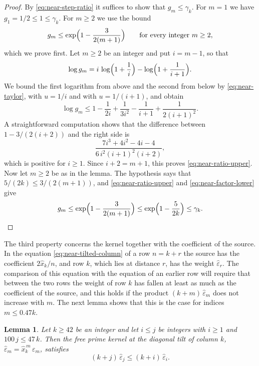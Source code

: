 \documentclass{amsart}
\newtheorem{lemma}[theorem]{Lemma}
\theoremstyle{definition}
\theoremstyle{remark}
\numberwithin{equation}{section}
\begin{document}
\begin{proof}
By \eqref{eq:near-step-ratio} it suffices to show that $g_m\le\gamma_k$.
For $m=1$ we have $g_1=1/2\le1\le\gamma_k$. For
$m\ge2$ we use the bound
\begin{equation}\label{eq:near-ratio-upper}
g_m\le\exp\Bigl(1-\frac{3}{2(m+1)}\Bigr)
\qquad\text{for every integer }m\ge2 ,
\end{equation}
which we prove first. Let $m\ge2$ be an integer and put $i=m-1$, so that
\[
\log g_m=i\,\log\Bigl(1+\frac1i\Bigr)-\log\Bigl(1+\frac{1}{i+1}\Bigr) .
\]
We bound the first logarithm from above and the second from below by
\eqref{eq:near-taylor}, with $u=1/i$ and with $u=1/(i+1)$, and obtain
\[
\log g_m\le1-\frac{1}{2i}+\frac{1}{3i^2}-\frac{1}{i+1}+\frac{1}{2(i+1)^2} .
\]
A straightforward computation shows that the difference between
$1-3/(2(i+2))$ and the right side is
\[
\frac{7i^3+4i^2-4i-4}{6\,i^2(i+1)^2(i+2)} ,
\]
which is positive for $i\ge1$. Since $i+2=m+1$, this proves
\eqref{eq:near-ratio-upper}. Now let $m\ge2$ be as in the lemma. The
hypothesis says that $5/(2k)\le3/(2(m+1))$, and
\eqref{eq:near-ratio-upper} and \eqref{eq:near-factor-lower} give
\[
g_m\le\exp\Bigl(1-\frac{3}{2(m+1)}\Bigr)\le\exp\Bigl(1-\frac{5}{2k}\Bigr)
\le\gamma_k . \qedhere
\]
\end{proof}

The third property concerns the kernel together with the coefficient of the
source. In the equation \eqref{eq:near-tilted-column} of a row $n=k+r$ the
source has the coefficient $2\hat x_k/n$, and row $k$, which lies at distance
$r$, has the weight $\hat\varepsilon_r$. The comparison of this
equation with the equation of an earlier row will require that
between the two rows the weight of row $k$ has fallen at least as much as
the coefficient of the source, and this holds if the product
$(k+m)\,\hat\varepsilon_m$ does not increase with $m$. The next
lemma shows that this is the case for indices $m\le0.47k$.

\begin{lemma}\label{lem:twopointcondition}
Let $k\ge42$ be an integer and let $i\le j$ be integers with $i\ge1$ and
$100\,j\le47\,k$. Then the free prime kernel at the diagonal tilt of column
$k$, $\hat\varepsilon_m=\hat x_k^{\,m}\,\varepsilon_m$, satisfies
\[
(k+j)\,\hat\varepsilon_j\le(k+i)\,\hat\varepsilon_i .
\]
\end{lemma}
\end{document}
